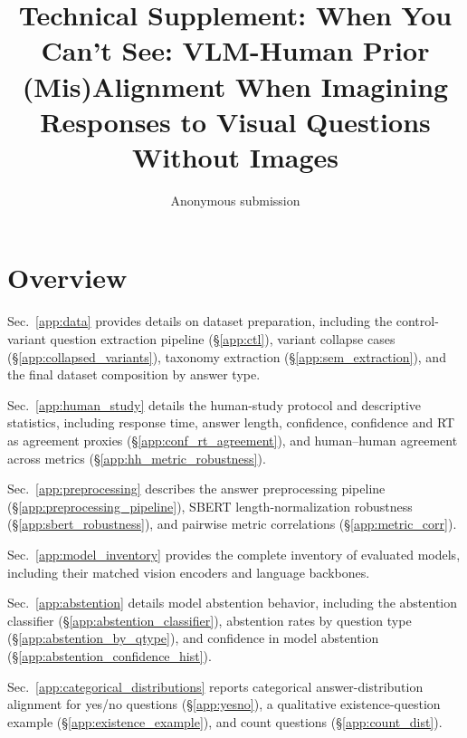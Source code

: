 \documentclass[letterpaper]{article} %
\title{Technical Supplement: When You Can't See: VLM-Human Prior (Mis)Alignment When Imagining Responses to Visual Questions Without Images}
\author{Anonymous submission}
\begin{document}
\maketitle
\appendix
\fi %

\setcounter{secnumdepth}{2}
\setcounter{section}{0}
\renewcommand{\thesection}{\Alph{section}}
\renewcommand{\thesubsection}{\thesection.\arabic{subsection}}

\makeatletter
{}
\makeatother
\renewcommand{\thefigure}{\thesection.\arabic{figure}}
\renewcommand{\thetable}{\thesection.\arabic{table}}
\renewcommand{\theequation}{\thesection.\arabic{equation}}
\setcounter{figure}{0}
\setcounter{table}{0}
\setcounter{equation}{0}
\section*{Overview}

Sec.~\ref{app:data} provides details on dataset preparation, including the control-variant question extraction pipeline (\S\ref{app:ctl}), variant collapse cases (\S\ref{app:collapsed_variants}), taxonomy extraction (\S\ref{app:sem_extraction}), and the final dataset composition by answer type.

Sec.~\ref{app:human_study} details the human-study protocol and descriptive statistics, including response time, answer length, confidence, confidence and RT as agreement proxies (\S\ref{app:conf_rt_agreement}), and human--human agreement across metrics (\S\ref{app:hh_metric_robustness}).

Sec.~\ref{app:preprocessing} describes the answer preprocessing pipeline (\S\ref{app:preprocessing_pipeline}), SBERT length-normalization robustness (\S\ref{app:sbert_robustness}), and pairwise metric correlations (\S\ref{app:metric_corr}).

Sec.~\ref{app:model_inventory} provides the complete inventory of evaluated models, including their matched vision encoders and language backbones.

Sec.~\ref{app:abstention} details model abstention behavior, including the abstention classifier (\S\ref{app:abstention_classifier}), abstention rates by question type (\S\ref{app:abstention_by_qtype}), and confidence in model abstention (\S\ref{app:abstention_confidence_hist}).

Sec.~\ref{app:categorical_distributions} reports categorical answer-distribution alignment for yes/no questions (\S\ref{app:yesno}), a qualitative existence-question example (\S\ref{app:existence_example}), and count questions (\S\ref{app:count_dist}).
\end{document}
